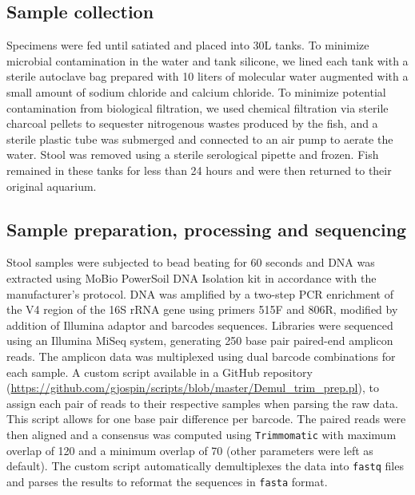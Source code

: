 





\subsection{Sample collection}

Specimens were fed until satiated and placed into 30L tanks. To minimize microbial contamination in the water and tank silicone, we lined each tank with a sterile autoclave bag prepared with 10 liters of molecular water augmented with a small amount of sodium chloride and calcium chloride. To minimize potential contamination from biological filtration, we used chemical filtration via sterile charcoal pellets to sequester nitrogenous wastes produced by the fish, and a sterile plastic tube was submerged and connected to an air pump to aerate the water. Stool was removed using a sterile serological pipette and frozen. Fish remained in these tanks for less than 24 hours and were then returned to their original aquarium.

\subsection{Sample preparation, processing and sequencing}

Stool samples were subjected to bead beating for 60 seconds and DNA was extracted using MoBio PowerSoil DNA Isolation kit in accordance with the manufacturer's protocol. DNA was amplified by a two-step PCR enrichment of the V4 region of the 16S rRNA gene using primers 515F and 806R, modified by addition of Illumina adaptor and barcodes sequences. Libraries were sequenced using an Illumina MiSeq system, generating 250 base pair paired-end amplicon reads. The amplicon data was multiplexed using dual barcode combinations for each sample. A custom script available in a GitHub repository (\url{https://github.com/gjospin/scripts/blob/master/Demul_trim_prep.pl}), to assign each pair of reads to their respective samples when parsing the raw data. This script allows for one base pair difference per barcode. The paired reads were then aligned and a consensus was computed using {\tt Trimmomatic} \cite{bolger2014trimmomatic} with maximum overlap of 120 and a minimum overlap of 70 (other parameters were left as default). The custom script automatically demultiplexes the data into {\tt fastq} files and parses the results to reformat the sequences in {\tt fasta} format.

